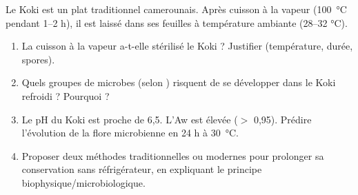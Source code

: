 \documentclass[11pt]{article}
\begin{document}
\begin{exercice}
Le Koki est un plat traditionnel camerounais. Après cuisson à la vapeur (\SI{100}{\degreeCelsius} pendant 1--2 h), il est laissé dans ses feuilles à température ambiante (28--32 °C).
\begin{enumerate}
    \item La cuisson à la vapeur a-t-elle stérilisé le Koki ? Justifier (température, durée, spores).
    \item Quels groupes de microbes (selon ) risquent de se développer dans le Koki refroidi ? Pourquoi ?
    \item Le pH du Koki est proche de 6,5. L'Aw est élevée ($>$ 0,95). Prédire l'évolution de la flore microbienne en 24 h à \SI{30}{\degreeCelsius}.
    \item Proposer deux méthodes traditionnelles ou modernes pour prolonger sa conservation sans réfrigérateur, en expliquant le principe biophysique/microbiologique.
\end{enumerate}
\end{exercice}
\end{document}
